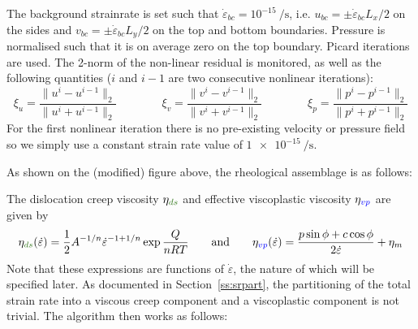 The background strainrate is set such that $\dot{\varepsilon}_{bc}=10^{-15}~\si{\per\second}$, i.e. 
$u_{bc}=\pm \dot{\varepsilon}_{bc} L_x/2$ on the sides and $v_{bc}=\pm \dot{\varepsilon}_{bc} L_y/2 $
on the top and bottom boundaries. Pressure is normalised such that it is on average zero on the top boundary. 
Picard iterations are used. The 2-norm of the non-linear residual 
is monitored, as well as the following quantities ($i$ and $i-1$ are two consecutive nonlinear iterations):
\[
\xi_u = \frac{\|u^i-u^{i-1}\|_2}{ \|u^i+u^{i-1}\|_2}
\qquad
\qquad
\xi_v = \frac{\|v^i-v^{i-1}\|_2}{ \|v^i+v^{i-1}\|_2}
\qquad
\qquad
\xi_p = \frac{\|p^i-p^{i-1}\|_2}{ \|p^i+p^{i-1}\|_2}
\] 
For the first nonlinear iteration there is no pre-existing velocity or pressure field so 
we simply use a constant strain rate value of $\SI{1e-15}{\per\second}$.


As shown on the (modified) figure above, the rheological assemblage is as follows:
\begin{center}

\end{center}
The dislocation creep viscosity $\eta_{\color{OliveGreen}ds}$ and effective 
viscoplastic viscosity $\eta_{\color{blue}vp}$ are given by 
\[
\eta_{\color{OliveGreen}ds}(\dot\varepsilon) = \frac{1}{2} A^{-1/n} \dot{\varepsilon}^{-1+1/n} \exp \frac{Q}{nRT}
\qquad
\text{and}
\qquad
\eta_{\color{blue}vp}(\dot\varepsilon) = \frac{p \sin \phi + c \cos \phi}{2 \dot{\varepsilon}}  + \eta_{m}
\]
Note that these expressions are functions of $\dot\varepsilon$, the nature of which will be specified later. 
As documented in Section~\ref{ss:srpart}, 
the partitioning of the total strain rate into a viscous creep component and a viscoplastic component 
is not trivial.  
The algorithm then works as follows:

